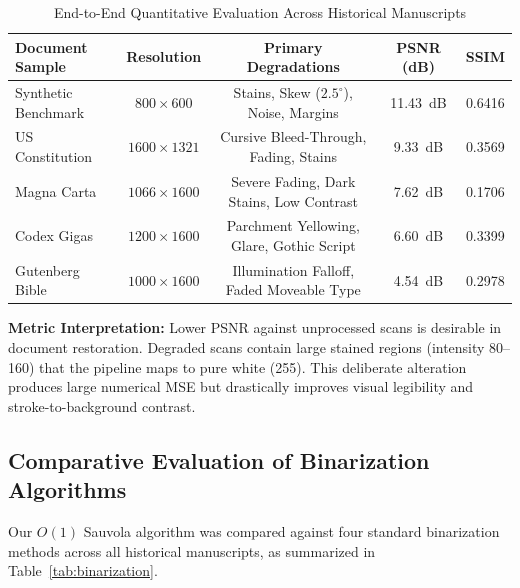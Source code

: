 \documentclass[11pt, a4paper]{article}
\begin{document}
\begin{table}[htbp]
\centering
\small
\caption{End-to-End Quantitative Evaluation Across Historical Manuscripts}
\vspace{0.4em}
\begin{tabular}{lcccc}
\toprule
\textbf{Document Sample} & \textbf{Resolution} & \textbf{Primary Degradations} & \textbf{PSNR (dB)} & \textbf{SSIM} \\
\midrule
Synthetic Benchmark     & $800 \times 600$    & Stains, Skew ($2.5^\circ$), Noise, Margins & 11.43~dB & 0.6416 \\
US Constitution         & $1600 \times 1321$  & Cursive Bleed-Through, Fading, Stains     & 9.33~dB  & 0.3569 \\
Magna Carta             & $1066 \times 1600$  & Severe Fading, Dark Stains, Low Contrast   & 7.62~dB  & 0.1706 \\
Codex Gigas             & $1200 \times 1600$  & Parchment Yellowing, Glare, Gothic Script  & 6.60~dB  & 0.3399 \\
Gutenberg Bible         & $1000 \times 1600$  & Illumination Falloff, Faded Moveable Type & 4.54~dB  & 0.2978 \\
\bottomrule
\end{tabular}
\label{tab:results}
\end{table}

\noindent\textbf{Metric Interpretation:} Lower PSNR against unprocessed scans is desirable in document restoration. Degraded scans contain large stained regions (intensity 80--160) that the pipeline maps to pure white (255). This deliberate alteration produces large numerical MSE but drastically improves visual legibility and stroke-to-background contrast.

\subsection{Comparative Evaluation of Binarization Algorithms}
Our $O(1)$ Sauvola algorithm was compared against four standard binarization methods across all historical manuscripts, as summarized in Table~\ref{tab:binarization}.
\end{document}
